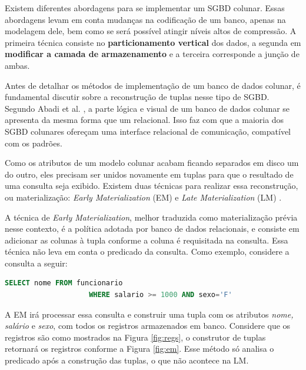 Existem diferentes abordagens para se implementar um SGBD colunar. Essas abordagens levam em conta 
mudanças na codificação de um banco, apenas na modelagem dele, bem como se será possível atingir 
níveis altos de compressão. A primeira técnica consiste no \textbf{particionamento vertical} dos dados, a 
segunda em \textbf{modificar a camada de armazenamento} e a terceira corresponde a junção de ambas.


Antes de detalhar os métodos de implementação de um banco de dados colunar, é fundamental discutir sobre a reconstrução de tuplas nesse tipo de SGBD. 
Segundo Abadi et al. \cite{abadi2007materialization}, a parte lógica e visual de um banco de dados colunar se apresenta da mesma forma que 
um relacional. Isso faz com que a maioria dos SGBD colunares ofereçam uma interface relacional de comunicação, compatível com os padrões.

Como os atributos de um modelo colunar acabam ficando separados em disco um do outro, eles precisam ser unidos novamente em tuplas para 
que o resultado de uma consulta seja exibido. Existem duas técnicas para realizar essa reconstrução, ou materialização: \textit{Early Materialization} (EM) e 
\textit{Late Materialization} (LM) \cite{abadi2007materialization, abadi2008query}.

A técnica de \textit{Early Materialization}, melhor traduzida como materialização prévia nesse contexto, é a política adotada por banco de dados relacionais, e consiste 
em adicionar as colunas à tupla conforme a coluna é requisitada na consulta. Essa técnica não leva em conta o predicado da consulta. Como exemplo, considere a consulta a seguir:

\begin{lstlisting}[language=SQL,label=sql_1]
                    SELECT nome FROM funcionario 
                    WHERE salario >= 1000 AND sexo='F'
\end{lstlisting}

A EM irá processar essa consulta e construir uma tupla com os atributos \textit{nome, salário} e \textit{sexo}, com todos os registros 
armazenados em banco. Considere que os registros são como mostrados na Figura \ref{fig:regs}, o construtor de tuplas retornará os registros conforme a Figura \ref{fig:em}. Esse método só analisa o predicado após a construção das tuplas, o que não acontece na LM. 

